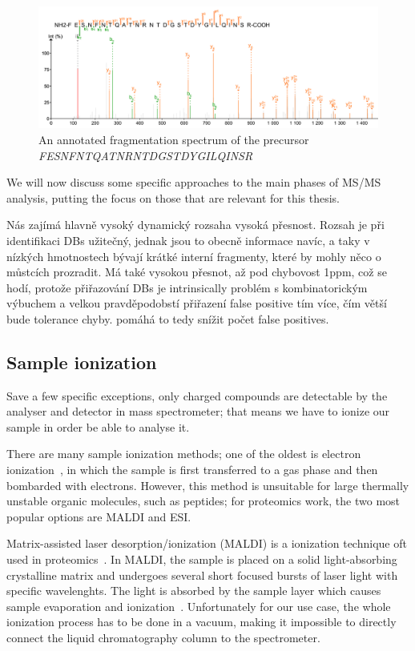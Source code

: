 \begin{figure}
  \centering
  \includegraphics[width=1\linewidth]{img/fragmentation-spectrum.png}
  \caption{An annotated fragmentation spectrum of the precursor \emph{FESNFNTQATNRNTDGSTDYGILQINSR}}\label{fig:frag-spectrum}
\end{figure}

We will now discuss some specific approaches to the main phases of MS/MS analysis, putting the focus on those that are relevant for this thesis.

Nás zajímá hlavně vysoký dynamický rozsaha  vysoká přesnost.  Rozsah je při identifikaci DBs užitečný, jednak jsou to obecně informace navíc, a taky v nízkých hmotnostech bývají krátké interní fragmenty, které by mohly něco o můstcích prozradit. Má také vysokou přesnot, až pod chybovost 1ppm, což se hodí, protože přiřazování DBs je intrinsically problém s kombinatorickým výbuchem a velkou pravděpodobstí přiřazení false positive tím více, čím větší bude tolerance chyby. pomáhá to tedy snížit počet false positives.

\subsection{Sample ionization}

Save a few specific exceptions, only charged compounds are detectable by the analyser and detector in mass spectrometer; that means we have to ionize our sample in order be able to analyse it.

There are many sample ionization methods; one of the oldest is electron ionization~\cite{field2013electron}, in which the sample is first transferred to a gas phase and then bombarded with electrons. However, this method is unsuitable for large thermally unstable organic molecules, such as peptides; for proteomics work, the two most popular options are MALDI and ESI.\@

Matrix-assisted laser desorption/ionization (MALDI) is a ionization technique oft used in proteomics~\cite{caprioli1997molecular, ross1997discrimination}. In MALDI, the sample is placed on a solid light-absorbing crystalline matrix and undergoes several short focused bursts of laser light with specific wavelenghts. The light is absorbed by the sample layer which causes sample evaporation and ionization~\cite{karas1985influence}. Unfortunately for our use case, the whole ionization process has to be done in a vacuum, making it impossible to directly connect the liquid chromatography column to the spectrometer.

